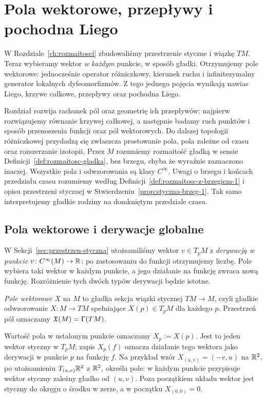 \chapter{Pola wektorowe, przepływy i pochodna Liego}
\label{ch:pola}

W Rozdziale~\ref{ch:rozmaitosci} zbudowaliśmy przestrzenie styczne i wiązkę $TM$.
Teraz wybieramy wektor \emph{w każdym} punkcie, w sposób gładki.
Otrzymujemy pole wektorowe: jednocześnie operator
różniczkowy, kierunek ruchu i infinitezymalny generator lokalnych dyfeomorfizmów.
Z tego jednego pojęcia wynikają nawias Liego, krzywe całkowe, przepływy oraz
pochodna Liego.

Rozdział rozwija rachunek pól oraz geometrię ich przepływów: najpierw
rozwiązujemy równanie krzywej całkowej, a następnie badamy ruch
punktów i sposób przenoszenia funkcji oraz pól wektorowych.
Do dalszej topologii różniczkowej przydadzą się zwłaszcza prostowanie
pola, pola zależne od czasu oraz rozszerzanie izotopii.
Przez $M$ rozumiemy rozmaitość gładką w sensie Definicji~\ref{def:rozmaitosc-gladka},
bez brzegu, chyba że wyraźnie zaznaczono inaczej.
Wszystkie pola i odwzorowania są klasy $C^\infty$.
Uwagi o brzegu i końcach przedziału czasu rozumiemy
według Definicji~\ref{def:rozmaitosc-z-brzegiem-1}
i opisu przestrzeni stycznej w
Stwierdzeniu~\ref{prop:styczna-brzeg-1}.
Tak samo interpretujemy gładkie rodziny na domkniętym przedziale czasu.



\section{Pola wektorowe i derywacje globalne}
\label{sec:derywacje}

W Sekcji~\ref{sec:przestrzen-styczna} utożsamiliśmy wektor $v\in T_pM$ z
\emph{derywacją w punkcie} $v\colon C^\infty(M)\to\mathbb{R}$:
po zastosowaniu do funkcji otrzymujemy liczbę. Pole wybiera taki
wektor w każdym punkcie, a jego działanie na funkcję zwraca nową
funkcję. Rozróżnienie tych dwóch typów derywacji będzie istotne.

\begin{definicja}
\emph{Pole wektorowe} $X$ na $M$ to gładka sekcja wiązki stycznej
$TM\to M$, czyli gładkie odwzorowanie $X\colon M\to TM$ spełniające
$X(p)\in T_pM$ dla każdego $p$. Przestrzeń pól oznaczamy $\mathfrak X(M)=\Gamma(TM)$.
\end{definicja}

Wartość pola w ustalonym punkcie oznaczamy $X_p:=X(p)$.
Jest to jeden wektor styczny w $T_pM$; zapis $X_p(f)$ oznacza
działanie tego wektora jako derywacji w punkcie $p$ na funkcję $f$.
Na przykład wzór $X_{(u,v)}=(-v,u)$ na $\mathbb{R}^2$, po utożsamieniu
$T_{(u,v)}\mathbb{R}^2$ z $\mathbb{R}^2$, określa pole:
w każdym punkcie przypisuje wektor styczny zależny gładko od $(u,v)$.
Poza początkiem układu wektor jest styczny do okręgu o środku w zerze,
a w początku $X_{(0,0)}=0$.

